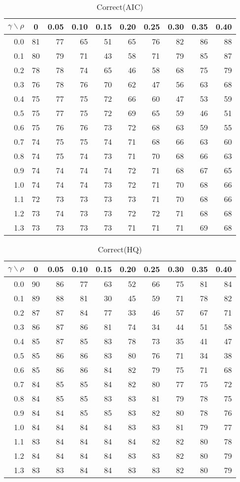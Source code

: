 \documentclass[12pt]{article}
\begin{document}
%
\begin{table}[!tbp]
\caption{Correct(AIC)}
 \begin{center}
 \begin{tabular}{r|rrrrrrrrr}\hline\hline
\multicolumn{1}{c|}{$\gamma\backslash\rho$}&\multicolumn{1}{c}{0}&\multicolumn{1}{c}{0.05}&\multicolumn{1}{c}{0.10}&\multicolumn{1}{c}{0.15}&\multicolumn{1}{c}{0.20}&\multicolumn{1}{c}{0.25}&\multicolumn{1}{c}{0.30}&\multicolumn{1}{c}{0.35}&\multicolumn{1}{c}{0.40}\tabularnewline
\hline

0.0&81&77&65&51&65&76&82&86&88\tabularnewline
0.1&80&79&71&43&58&71&79&85&87\tabularnewline
0.2&78&78&74&65&46&58&68&75&79\tabularnewline
0.3&76&78&76&70&62&47&56&63&68\tabularnewline
0.4&75&77&75&72&66&60&47&53&59\tabularnewline
0.5&75&77&75&72&69&65&59&46&51\tabularnewline
0.6&75&76&76&73&72&68&63&59&55\tabularnewline
0.7&74&75&75&74&71&68&66&63&60\tabularnewline
0.8&74&75&74&73&71&70&68&66&63\tabularnewline
0.9&74&74&74&74&72&71&68&67&65\tabularnewline
1.0&74&74&74&73&72&71&70&68&66\tabularnewline
1.1&72&73&73&73&73&71&70&68&66\tabularnewline
1.2&73&74&73&73&72&72&71&68&68\tabularnewline
1.3&73&73&73&73&71&71&71&69&68\tabularnewline
\hline
\end{tabular}

\end{center}

\end{table}

%
\begin{table}[!tbp]
\caption{Correct(HQ)}
 \begin{center}
 \begin{tabular}{r|rrrrrrrrr}\hline\hline
\multicolumn{1}{c|}{$\gamma\backslash\rho$}&\multicolumn{1}{c}{0}&\multicolumn{1}{c}{0.05}&\multicolumn{1}{c}{0.10}&\multicolumn{1}{c}{0.15}&\multicolumn{1}{c}{0.20}&\multicolumn{1}{c}{0.25}&\multicolumn{1}{c}{0.30}&\multicolumn{1}{c}{0.35}&\multicolumn{1}{c}{0.40}\tabularnewline
\hline

0.0&90&86&77&63&52&66&75&81&84\tabularnewline
0.1&89&88&81&30&45&59&71&78&82\tabularnewline
0.2&87&87&84&77&33&46&57&67&71\tabularnewline
0.3&86&87&86&81&74&34&44&51&58\tabularnewline
0.4&85&87&85&83&78&73&35&41&47\tabularnewline
0.5&85&86&86&83&80&76&71&34&38\tabularnewline
0.6&85&86&86&84&82&79&75&71&68\tabularnewline
0.7&84&85&85&84&82&80&77&75&72\tabularnewline
0.8&84&85&85&83&83&81&79&78&75\tabularnewline
0.9&84&84&85&85&83&82&80&78&76\tabularnewline
1.0&84&84&84&84&83&83&81&79&77\tabularnewline
1.1&83&84&84&84&84&82&82&80&78\tabularnewline
1.2&84&84&84&84&83&83&82&80&79\tabularnewline
1.3&83&83&84&84&83&83&82&80&79\tabularnewline
\hline
\end{tabular}

\end{center}

\end{table}
\end{document}
